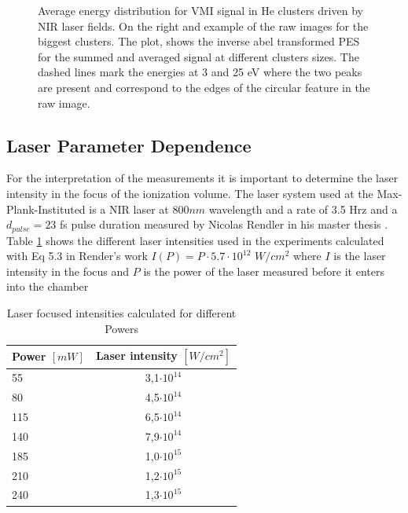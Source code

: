 \begin{figure}[h!]
\caption[Average energy distributions in NIr]{Average energy distribution for VMI signal in He clusters driven by NIR laser fields. On the right and example of the raw images for the biggest clusters. The plot, shows the inverse abel transformed PES for the summed and averaged signal at different clusters sizes. The dashed lines mark the energies at 3 and 25 eV where the two peaks are present and correspond to the edges of the circular feature in the raw image.}
\label{fig:NIrsummed}
\end{figure}


\subsection{Laser Parameter Dependence}

For the interpretation of the measurements it is important to determine the laser intensity in the focus of the ionization volume. The laser system used at the Max-Plank-Instituted is a NIR laser at $800nm$ wavelength and a rate of 3.5 Hrz and a $d_{pulse}=23$ fs pulse duration measured by Nicolas Rendler in his master thesis \cite{rendler_einzelschuss_2017}. Table \ref{tab:nirintens} shows the different laser intensities used in the experiments calculated with Eq 5.3 in Render’s work \cite{rendler_einzelschuss_2017} $I(P)=P\cdot 5.7\cdot 10^{12}$ $W/cm^{2}$ where $I$ is the laser intensity in the focus and $P$ is the power of the laser measured before it enters into the chamber

\begin{table}[t]
\centering
\begin{tabular}{|l|c|}
\hline
\multicolumn{1}{|c|}{Power $[mW]$} & Laser intensity $[W/cm^{2}]$ \\ \hline
55                                  & 3,1$\cdot10^{14}$                                            \\ \hline
80                                  & 4,5$\cdot10^{14}$                                              \\ \hline
115                                 & 6,5$\cdot10^{14}$                                             \\ \hline
140                                 & 7,9$\cdot10^{14}$                                            \\ \hline
185                                 & 1,0$\cdot10^{15}$                                            \\ \hline
210                                 & 1,2$\cdot10^{15}$                                            \\ \hline
240                                 & 1,3$\cdot10^{15}$                                             \\ \hline
\end{tabular}
\caption[NIR laser power to intensities]{Laser focused intensities calculated for different Powers }
\label{tab:nirintens}
\end{table}


